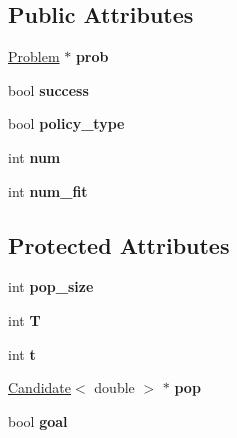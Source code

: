 \subsection*{Public Attributes}
\begin{DoxyCompactItemize}
\item 
\hypertarget{classOptAlg_ad83a3cc560bd483e499f26f629817f21}{}\hyperlink{classProblem}{Problem} $\ast$ {\bfseries prob}\label{classOptAlg_ad83a3cc560bd483e499f26f629817f21}

\item 
\hypertarget{classOptAlg_a2150acef11d441cb786afe578051e56f}{}bool {\bfseries success}\label{classOptAlg_a2150acef11d441cb786afe578051e56f}

\item 
\hypertarget{classOptAlg_ad269f7018945be9bdd6fb0237fb73c74}{}bool {\bfseries policy\+\_\+type}\label{classOptAlg_ad269f7018945be9bdd6fb0237fb73c74}

\item 
\hypertarget{classOptAlg_a90c8e3ad1c547ae5a8ee572b8f5aec98}{}int {\bfseries num}\label{classOptAlg_a90c8e3ad1c547ae5a8ee572b8f5aec98}

\item 
\hypertarget{classOptAlg_aad208e0441922169d0333c2277f1b7aa}{}int {\bfseries num\+\_\+fit}\label{classOptAlg_aad208e0441922169d0333c2277f1b7aa}

\end{DoxyCompactItemize}
\subsection*{Protected Attributes}
\begin{DoxyCompactItemize}
\item 
\hypertarget{classOptAlg_a3e8052f94b8cbecfe087377cc5c9a530}{}int {\bfseries pop\+\_\+size}\label{classOptAlg_a3e8052f94b8cbecfe087377cc5c9a530}

\item 
\hypertarget{classOptAlg_a9cbac99eb4f69fb2a3860ecec0dd3dc3}{}int {\bfseries T}\label{classOptAlg_a9cbac99eb4f69fb2a3860ecec0dd3dc3}

\item 
\hypertarget{classOptAlg_a716972bd2e408aa4b77be28fa2f0cbb1}{}int {\bfseries t}\label{classOptAlg_a716972bd2e408aa4b77be28fa2f0cbb1}

\item 
\hypertarget{classOptAlg_ae3e61ddad0b8f9a7170167852828c292}{}\hyperlink{classCandidate}{Candidate}$<$ double $>$ $\ast$ {\bfseries pop}\label{classOptAlg_ae3e61ddad0b8f9a7170167852828c292}

\item 
\hypertarget{classOptAlg_adf188f99e90b0d81c699dd5e8da9d93a}{}bool {\bfseries goal}\label{classOptAlg_adf188f99e90b0d81c699dd5e8da9d93a}

\end{DoxyCompactItemize}


